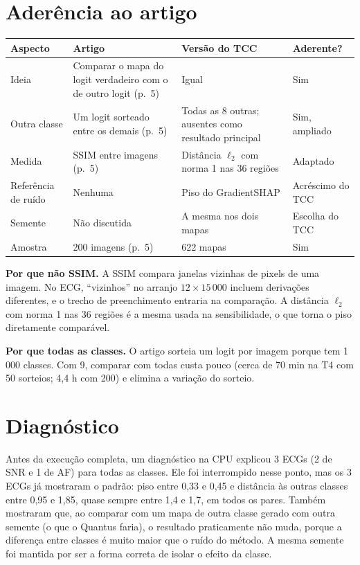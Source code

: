 \documentclass[11pt,a4paper]{article}
\begin{document}
\section{Aderência ao artigo}
\begin{center}\small
\begin{tabularx}{\linewidth}{lXXl}
\toprule
\textbf{Aspecto} & \textbf{Artigo} & \textbf{Versão do TCC} & \textbf{Aderente?} \\
\midrule
Ideia & Comparar o mapa do logit verdadeiro com o de outro logit (p.~5) & Igual & Sim \\ \addlinespace
Outra classe & Um logit sorteado entre os demais (p.~5) & Todas as 8 outras; ausentes como resultado principal & Sim, ampliado \\ \addlinespace
Medida & SSIM entre imagens (p.~5) & Distância $\ell_2$ com norma 1 nas 36 regiões & Adaptado \\ \addlinespace
Referência de ruído & Nenhuma & Piso do GradientSHAP & Acréscimo do TCC \\ \addlinespace
Semente & Não discutida & A mesma nos dois mapas & Escolha do TCC \\ \addlinespace
Amostra & 200 imagens (p.~5) & 622 mapas & Sim \\
\bottomrule
\end{tabularx}
\end{center}

\textbf{Por que não SSIM.} A SSIM compara janelas vizinhas de pixels de uma imagem. No ECG, “vizinhos” no arranjo $12 \times 15\,000$ incluem derivações diferentes, e o trecho de preenchimento entraria na comparação. A distância $\ell_2$ com norma 1 nas 36 regiões é a mesma usada na sensibilidade, o que torna o piso diretamente comparável.

\textbf{Por que todas as classes.} O artigo sorteia um logit por imagem porque tem 1\,000 classes. Com 9, comparar com todas custa pouco (cerca de 70 min na T4 com 50 sorteios; 4,4 h com 200) e elimina a variação do sorteio.

\section{Diagnóstico}
Antes da execução completa, um diagnóstico na CPU explicou 3 ECGs (2 de SNR e 1 de AF) para todas as classes. Ele foi interrompido nesse ponto, mas os 3 ECGs já mostraram o padrão: piso entre 0,33 e 0,45 e distância às outras classes entre 0,95 e 1,85, quase sempre entre 1,4 e 1,7, em todos os pares. Também mostraram que, ao comparar com um mapa de outra classe gerado com outra semente (o que o Quantus faria), o resultado praticamente não muda, porque a diferença entre classes é muito maior que o ruído do método. A mesma semente foi mantida por ser a forma correta de isolar o efeito da classe.
\end{document}
